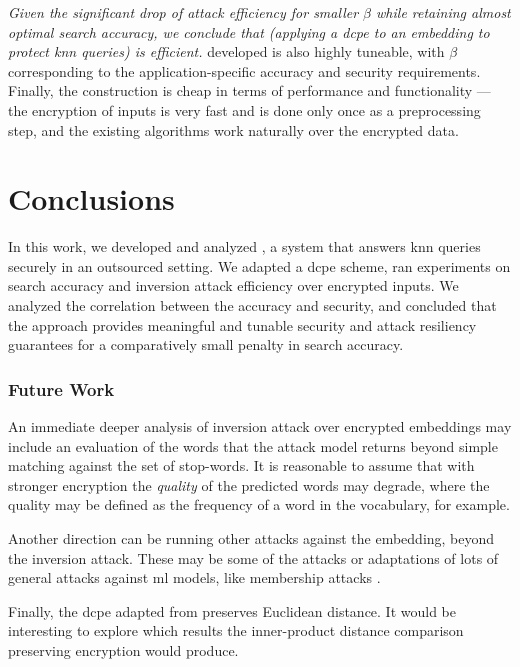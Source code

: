 		\emph{Given the significant drop of attack efficiency for smaller $\beta$ while retaining almost optimal search accuracy, we conclude that \kanon{} (applying a \acrlong{dcpe} to an embedding to protect \acrshort{knn} queries) is efficient.}
		\kanon{} developed is also highly tuneable, with $\beta$ corresponding to the application-specific accuracy and security requirements.
		Finally, the construction is cheap in terms of performance and functionality --- the encryption of inputs is very fast and is done only once as a preprocessing step, and the existing algorithms work naturally over the encrypted data.

	\section{Conclusions}

		In this work, we developed and analyzed \kanon{}, a system that answers \acrshort{knn} queries securely in an outsourced setting.
		We adapted a \acrshort{dcpe} scheme, ran experiments on search accuracy and inversion attack efficiency over encrypted inputs.
		We analyzed the correlation between the accuracy and security, and concluded that the approach provides meaningful and tunable security and attack resiliency guarantees for a comparatively small penalty in search accuracy.

		\subsubsection{Future Work}

			An immediate deeper analysis of inversion attack over encrypted embeddings may include an evaluation of the words that the attack model returns beyond simple matching against the set of stop-words.
			It is reasonable to assume that with stronger encryption the \emph{quality} of the predicted words may degrade, where the quality may be defined as the frequency of a word in the vocabulary, for example.

			Another direction can be running other attacks against the embedding, beyond the inversion attack.
			These may be some of the \textcite{embedding-attacks} attacks or adaptations of lots of general attacks against \acrshort{ml} models, like membership attacks \cite{membership-attacks,enhanced-membership-attacks}.

			Finally, the \acrshort{dcpe} adapted from \cite{dcpe} preserves Euclidean distance.
			It would be interesting to explore which results the inner-product distance comparison preserving encryption would produce.
